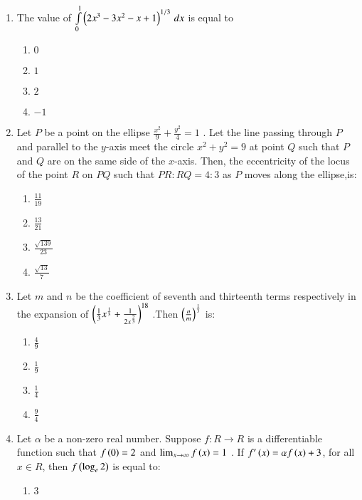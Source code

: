 \documentclass[journal]{IEEEtran}
\begin{document}
\begin{enumerate}
{}
\item{
The value of $\int\limits_{0}^{1}\left(2x^3-3x^2-x+1\right)^{1/3}\,dx$ is equal to
\begin{multicols}{4}
\begin{enumerate}
\item $0$
\item $1$
\item $2$
\item $-1$
\end{enumerate}
\end{multicols}
}
\item{
Let $P$ be a point on the ellipse $\frac{x^2}{9}+\frac{y^2}{4}=1$ . Let the line passing through $P$ and parallel to the $y$-axis meet the circle $x^2+y^2=9$ at point $Q$ such that $P$ and $Q$ are on the same side of the $x$-axis. Then, the eccentricity of the locus of the point $R$ on $PQ$ such that $PR:RQ=4:3$ as $P$ moves along the ellipse,is:
\begin{multicols}{4}
\begin{enumerate}
\item $\frac{11}{19}$
\item $\frac{13}{21}$
\item $\frac{\sqrt{139}}{23}$
\item $\frac{\sqrt{13}}{7}$
\end{enumerate}
\end{multicols}
}
\item{
Let $m$ and $n$ be the coefficient of seventh and thirteenth terms respectively in the expansion of $\left(\frac{1}{3}x^{\frac{1}{3}}+\frac{1}{2x^\frac{2}{3}}\right)^{18}$ .Then $\left(\frac{n}{m}\right)^\frac{1}{3}$ is:
\begin{multicols}{4}
\begin{enumerate}
\item $\frac{4}{9}$
\item $\frac{1}{9}$
\item $\frac{1}{4}$
\item $\frac{9}{4}$
\end{enumerate}
\end{multicols}
}
\item{
Let $\alpha$ be a non-zero real number. Suppose $f:R\to R$ is a differentiable function such that $f\left(0\right)=2$ and $\lim_{x\to\infty}f\left(x\right)=1$ . If $f'\left(x\right)=\alpha f\left(x\right)+3$, for all $x\in R$, then $f\left(\log_e2\right)$ is equal to:
\begin{multicols}{4}
\begin{enumerate}
\item $3$

\end{enumerate}
\end{multicols}}
\end{enumerate}
\end{document}
